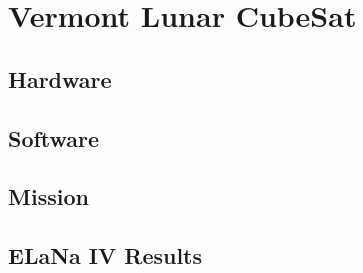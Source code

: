 
\section{Vermont Lunar CubeSat}
\label{sec:vtlunar}

\subsection{Hardware}
\label{sec:vtlunar-hardware}

\subsection{Software}
\label{sec:vtlunar-software}


\subsection{Mission}
\label{sec:vtlunar-mission}

\subsection{ELaNa IV Results}
\label{sec:vtlunar-elana}

